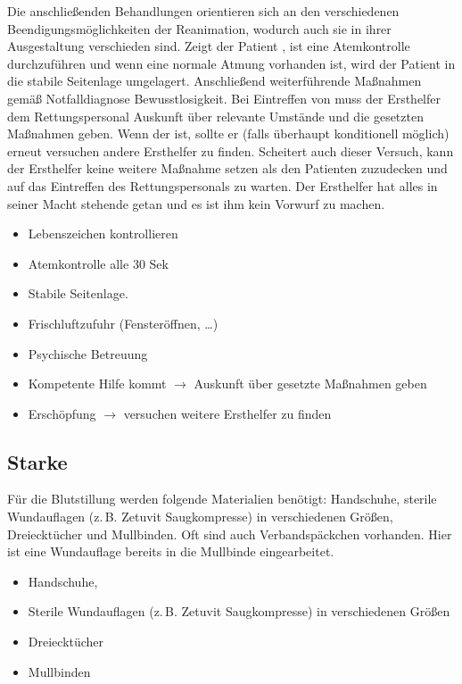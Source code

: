  
{%
Die anschließenden Behandlungen orientieren sich an den
verschiedenen Beendigungsmöglichkeiten der Reanimation,
wodurch auch sie in ihrer Ausgestaltung verschieden sind.
Zeigt der Patient , ist eine Atemkontrolle
durchzuführen und wenn eine normale Atmung vorhanden ist,
wird der Patient in die stabile Seitenlage umgelagert.
Anschließend weiterführende Maßnahmen gemäß Notfalldiagnose
Bewusstlosigkeit.
Bei Eintreffen von  muss der Ersthelfer
dem Rettungspersonal Auskunft über relevante Umstände und
die gesetzten Maßnahmen geben.
Wenn der  ist, sollte er (falls
überhaupt konditionell möglich) erneut versuchen andere 
Ersthelfer zu finden. Scheitert auch dieser Versuch, kann
der Ersthelfer keine weitere Maßnahme setzen als den
Patienten zuzudecken und auf das Eintreffen des 
Rettungspersonals zu warten. Der Ersthelfer hat alles in
seiner Macht stehende getan und es ist ihm kein Vorwurf zu
machen.
}{
\begin{itemize}
  \item Lebenszeichen kontrollieren
  \item Atemkontrolle alle 30 Sek
  \item Stabile Seitenlage.
  \item Frischluftzufuhr (Fensteröffnen, \ldots)
  \item Psychische Betreuung
  \item Kompetente Hilfe kommt ${\rightarrow}$ Auskunft über gesetzte
  Maßnahmen geben
  \item Erschöpfung ${\rightarrow}$ versuchen weitere Ersthelfer zu
  finden
\end{itemize}

}{}{}{}




\subsection{Starke }
\label{topic:starke-blutung}





{%
%
Für die Blutstillung werden folgende Materialien
benötigt: Handschuhe, sterile Wundauflagen (z.\,B.
Zetuvit\texttrademark{} Saugkompresse) in verschiedenen
Größen, Dreiecktücher und Mullbinden. Oft sind auch
Verbandspäckchen vorhanden. Hier ist eine Wundauflage
bereits in die Mullbinde eingearbeitet.
}
{ %
\begin{itemize}
  \item Handschuhe, 
  \item Sterile Wundauflagen (z.\,B.
  Zetuvit\texttrademark{} Saugkompresse) in verschiedenen
  Größen 
  \item Dreiecktücher 
  \item Mullbinden
\end{itemize}
}
{}
{}
{}

